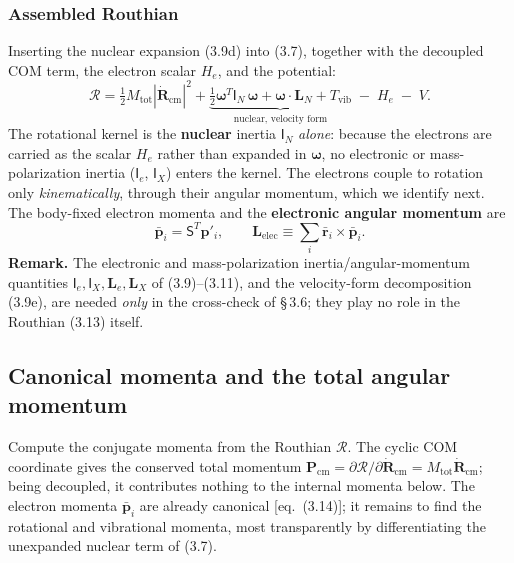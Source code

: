 \subsubsection{Assembled Routhian}

Inserting the nuclear expansion (3.9d) into (3.7), together with the decoupled COM term, the electron scalar $H_e$, and the potential:
\begin{equation}
\boxed{\;\mathcal{R}=\tfrac12 M_{\mathrm{tot}}|\dot{\mathbf{R}}_{\mathrm{cm}}|^2+\underbrace{\tfrac12\boldsymbol{\omega}^{T}\mathsf{I}_N\,\boldsymbol{\omega}+\boldsymbol{\omega}\!\cdot\!\mathbf{L}_N+T_{\mathrm{vib}}}_{\text{nuclear, velocity form}}\;-\;H_e\;-\;V.\;} \tag{3.13}
\end{equation}
The rotational kernel is the \textbf{nuclear} inertia $\mathsf{I}_N$ \emph{alone}: because the electrons are carried as the scalar $H_e$ rather than expanded in $\boldsymbol{\omega}$, no electronic or mass-polarization inertia ($\mathsf{I}_e$, $\mathsf{I}_X$) enters the kernel. The electrons couple to rotation only \emph{kinematically}, through their angular momentum, which we identify next. The body-fixed electron momenta and the \textbf{electronic angular momentum} are
\begin{equation}
\bar{\mathbf{p}}_i=\mathsf{S}^{T}\mathbf{p}'_i,\qquad \mathbf{L}_{\mathrm{elec}}\equiv\sum_i\bar{\mathbf{r}}_i\!\times\!\bar{\mathbf{p}}_i. \tag{3.14}
\end{equation}
\textbf{Remark.} The electronic and mass-polarization inertia/angular-momentum quantities $\mathsf{I}_e,\mathsf{I}_X,\mathbf{L}_e,\mathbf{L}_X$ of (3.9)--(3.11), and the velocity-form decomposition (3.9e), are needed \emph{only} in the cross-check of \S\,3.6; they play no role in the Routhian (3.13) itself.

\subsection{Canonical momenta and the total angular momentum}

Compute the conjugate momenta from the Routhian $\mathcal{R}$. The cyclic COM coordinate gives the conserved total momentum $\mathbf{P}_{\mathrm{cm}}=\partial \mathcal{R}/\partial\dot{\mathbf{R}}_{\mathrm{cm}}=M_{\mathrm{tot}}\dot{\mathbf{R}}_{\mathrm{cm}}$; being decoupled, it contributes nothing to the internal momenta below. The electron momenta $\bar{\mathbf{p}}_i$ are already canonical [eq.~(3.14)]; it remains to find the rotational and vibrational momenta, most transparently by differentiating the unexpanded nuclear term of (3.7).

